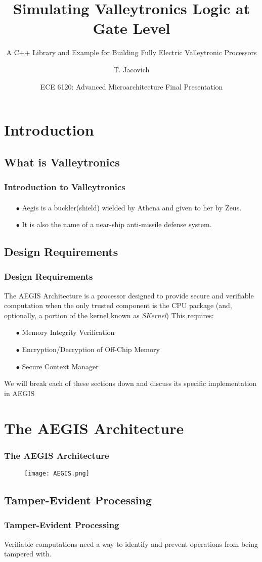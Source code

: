 \documentclass{beamer}
\title[Simulating Valleytronics Logic at the Gate Level] %
{Simulating Valleytronics Logic at Gate Level}
\subtitle{A C++ Library and Example for Building Fully Electric Valleytronic Processors}
\author[Author] %
{T. Jacovich\inst{1}}
\institute[Universities Here and There] %
{
  \inst{1}%
  Department of Physics\\
  The George Washington University
}
\date[AM2018] %
{ECE 6120: Advanced Microarchitecture Final Presentation}
\begin{document}
\frame{\titlepage}
\section[Introduction]{Introduction}
  \subsection[What is Valleytronics]{What is Valleytronics}
  \begin{frame}
    \frametitle{Introduction to Valleytronics}
    \framesubtitle{}
    
\begin{itemize}
  \item[$\bullet$] Aegis is a buckler(shield) wielded by Athena and given to her by Zeus.
  
  \item[$\bullet$] It is also the name of a near-ship anti-missile defense system.     
\end{itemize}


  \end{frame}
    \subsection[Design Requirements]{Design Requirements}
  \begin{frame}
    \frametitle{Design Requirements}
    \small The AEGIS Architecture is a processor designed to provide secure and verifiable computation when the only trusted component is the CPU package (and, optionally, a portion of the kernel known as \textit{SKernel})
     This requires:
    \begin{itemize}
  \item[$\bullet$] Memory Integrity Verification
  
  \item[$\bullet$] Encryption/Decryption of Off-Chip Memory
  
  \item[$\bullet$] Secure Context Manager
\end{itemize}
\vspace*{20pt}
 \small We will break each of these sections down and discuss its specific implementation in AEGIS 
\vspace*{20pt}
  \end{frame}
  
\section[The AEGIS Architecture]{The AEGIS Architecture}
\begin{frame}
\frametitle{The AEGIS Architecture}
\begin{figure}
 		 \texttt{[image: AEGIS.png]}
  	\end{figure}

\end{frame}
\subsection[Tamper-Evident Processing]{Tamper-Evident Processing}
\begin{frame}
\frametitle{Tamper-Evident Processing}
Verifiable computations need a way to identify and prevent operations from being tampered with. 


\end{frame}
\end{document}
